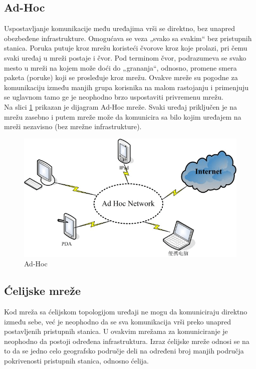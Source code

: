 \documentclass[a4paper]{article}
\begin{document}
    \subsection{Ad-Hoc}
Uspostavljanje komunikacije među uređajima vrši se direktno, bez unapred obezbeđene infrastrukture. Omogućava se veza „svako sa svakim“ bez pristupnih stanica. Poruka putuje kroz mrežu koristeći čvorove kroz koje prolazi, pri čemu svaki uređaj u mreži postaje i čvor. Pod terminom čvor, podrazumeva se svako mesto u mreži na kojem može doći do „grananja“, odnosno, promene smera paketa (poruke) koji se prosleđuje kroz mrežu. Ovakve mreže su pogodne za komunikaciju između manjih grupa korisnika na malom rastojanju i primenjuju se uglavnom tamo ge je neophodno brzo uspostaviti privremenu mrežu.\\
Na slici \ref{fig:adhoc} prikazan je dijagram Ad-Hoc mreže. Svaki uređaj priključen je na mrežu zasebno i putem mreže može da komunicira sa bilo kojim uređajem na mreži nezavisno (bez mrežne infrastrukture). 
\newpage

\begin{figure}[ht!]
\begin{center}
\includegraphics[scale=0.35]{AdHoc.png}
\end{center}
\caption{Ad-Hoc \cite{AdHoc}}
\label{fig:adhoc}
\end{figure}



    \subsection{Ćelijske mreže}
 Kod mreža sa ćelijskom topologijom uređaji ne mogu da komuniciraju direktno između sebe, već je neophodno da se sva komunikacija vrši preko unapred postavljenih pristupnih stanica. U ovakvim mrežama za komuniciranje je neophodno da postoji određena infrastruktura. Izraz ćelijske mreže odnosi se na to da se jedno celo geografsko područje deli na određeni broj manjih područja pokrivenosti pristupnih stanica, odnosno ćelija.
\end{document}
